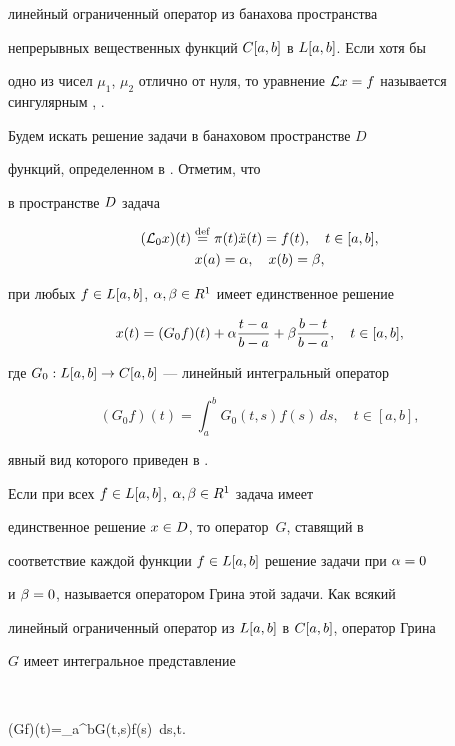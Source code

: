 линейный ограниченный оператор из банахова пространства


непрерывных вещественных функций $\SC$ в $\SL$. Если хотя бы


одно из чисел $\mu_1$, $\mu_2$ отлично от нуля, то уравнение $\L


x=f$ называется сингулярным \cite{Kig}, \cite{Lab}.





Будем искать решение задачи  в банаховом пространстве $D$


функций, определенном в \cite{Br1}.  Отметим, что


в пространстве $\D$ задача


\begin{gather*}


(\L_0 x)(t)\eqdef\pi(t)\Ddot x(t)=f(t),\quad t\in[a,b],\\


x(a)=\alpha,\quad x(b)=\beta,


\end{gather*}


при  любых $f\in\SL$, $\aa, \bb\in\R$ имеет единственное решение


$$


x(t)=(G_0f)(t)+\aa\dfrac{t-a}{b-a}+\bb\dfrac{b-t}{b-a},\quad t\in[a,b],


$$


где $G_0:\SL\to\SC$ --- линейный интегральный оператор


$$


(G_0f)(t)=\int_a^bG_0(t,s)f(s)\, ds,\quad t\in[a,b],


$$


явный вид которого приведен в \cite{Br1}.





Если при всех $f\in\SL$, $\aa,\bb\in\R$ задача  имеет


единственное решение $x\in\D$, то оператор~$G$, ставящий в


соответствие каждой функции $f\in\SL$ решение задачи  при $\aa=0$


и $\bb=0$, называется оператором Грина этой задачи. Как всякий


линейный ограниченный оператор  из $\SL$ в $\SC$, оператор Грина


$G$ имеет интегральное представление \cite{AMR}


$$


(Gf)(t)=\int_a^bG(t,s)f(s)\, ds,\quad t\in[a,b].


